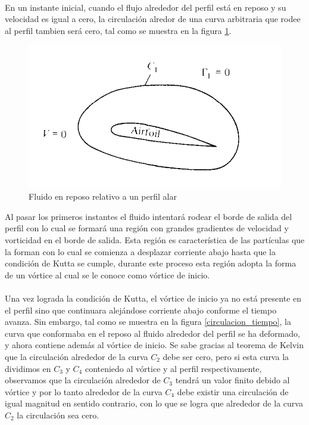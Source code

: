 \documentclass[letterpaper, openright, 12pt]{book}
\begin{document}
    \paragraph*{}
        En un instante inicial, cuando el flujo alrededor del perfil está en
        reposo y su velocidad es igual a cero, la circulación alredor de una
        curva arbitraria que rodee al perfil tambien será cero, tal como se
        muestra en la figura \ref{circulacion_reposo}.

        \begin{figure}[htbp!]
            \centering
            \includegraphics[width=115mm]{./Imagenes/circulacion_reposo}
            \caption[Fluido en reposo relativo a un perfil alar]{Fluido en
                reposo relativo a un perfil alar\cite{anderson_fundamentals}}
            \label{circulacion_reposo}
        \end{figure}

        Al pasar los primeros instantes el fluido intentará rodear el borde de
        salida del perfil con lo cual se formará una región con grandes
        gradientes de velocidad y vorticidad en el borde de salida. Esta región
        es característica de las partículas que la forman con lo cual se
        comienza a desplazar corriente abajo hasta que la condición de Kutta se
        cumple, durante este proceso esta región adopta la forma de un vórtice
        al cual se le conoce como vórtice de inicio.

    \paragraph*{}
        Una vez lograda la condición de Kutta, el vórtice de inicio ya no está
        presente en el perfil sino que continuara alejándose corriente abajo
        conforme el tiempo avanza. Sin embargo, tal como se muestra en la figura
        \ref{circulacion_tiempo}, la curva que conformaba en el reposo al fluido
        alrededor del perfil se ha deformado, y ahora contiene además al
        vórtice de inicio. Se sabe gracias al teorema de Kelvin que la
        circulación alrededor de la curva $C_2$ debe ser cero, pero si esta
        curva la dividimos en $C_3$ y $C_4$ conteniedo al vórtice y al perfil
        respectivamente, observamos que la circulación alrededor de $C_3$ tendrá
        un valor finito debido al vórtice y por lo tanto alrededor de la curva
        $C_4$ debe existir una circulación de igual magnitud en sentido
        contrario, con lo que se logra que alrededor de la curva $C_2$ la
        circulación sea cero.
\end{document}

